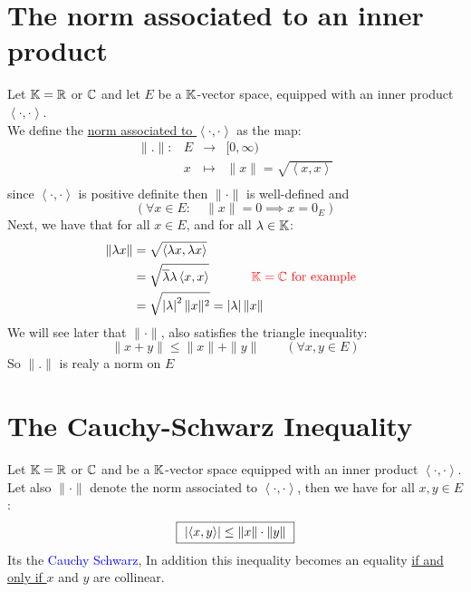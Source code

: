 \documentclass{report}
\begin{document}
\section{The norm associated to an inner product }
\begin{definition}[]
Let $\mathbb{K} = \mathbb{R} $  or $\mathbb{C}  $ and let $E $ be a $\mathbb{K} $-vector space,
equipped with an inner product $\left\langle \cdot , \cdot  \right\rangle  $.\\
We define the 
\underline{ norm associated to }
$\left\langle \cdot , \cdot  \right\rangle  $ as the map: 
\[
\begin{array}{cccc}
	\| . \|  : &  E  & \longrightarrow & [0, \infty ) \\

           &    x& \longmapsto     &  \| x \|  =  
	   \sqrt{\left\langle x,x \right\rangle } \\ 
\end{array}
\]
since $\left\langle \cdot ,\cdot  \right\rangle  $ 
is positive definite then 
$\| \cdot  \|  $ is well-defined and 
\[
\left( 
	\forall  x \in  E: \quad 
	\| x \| = 0 \implies 
	x = 0_{E}
\right)
\]
Next, we have that for all $x \in  E $, and for all $\lambda \in  \mathbb{K} $: 
\begin{align*}
	\| \lambda x \|  &=
	\sqrt{\left\langle 
			\lambda x, \lambda x
	\right\rangle }  \\
	&= \sqrt{
		\overline{\lambda } \lambda 
		\left\langle 
			x, x
		\right\rangle 
	} \quad \quad 
	\quad 
	\text{
		\textcolor{red}{
		$\mathbb{K} = \mathbb{C}  $ for example
		}
	} 
	\\
	&= \sqrt{ \left| \lambda \right|^2  \| x \| ^2 }  =
	\left| \lambda \right| \| x \| 
\end{align*}
We will see later that $\| \cdot  \|  $, also satisfies the triangle
inequality: 
\[
\| x+y \|  \leq \| x \| + \| y \| \quad 
\quad 
\left( 
	\forall x,y \in  E
\right)
\]
So $\| . \|  $  is realy a norm on $E $ 
\end{definition}
\section{The Cauchy-Schwarz Inequality}
\begin{theorem}[]
Let $\mathbb{K} = \mathbb{R}  $ or $\mathbb{C}  $ and be a $\mathbb{K} $-vector space equipped
with an inner product 
$\left\langle \cdot ,\cdot  \right\rangle  $. Let also 
$\| \cdot  \|  $ denote the norm associated to 
$\left\langle \cdot  , \cdot  \right\rangle  $, 
then we have for all $x,y \in E $ : 
\[
	\fbox{
		$  
		\left| 
		\left\langle x, y \right\rangle    
		\right|
		\leq \| x \| \cdot  \| y \| $  
	}
\]
Its the \textcolor{blue}{Cauchy Schwarz}, In addition this 
inequality becomes an equality \underline{ if and only if } 
$x $ and $y $ are collinear.
\end{theorem}
\end{document}
